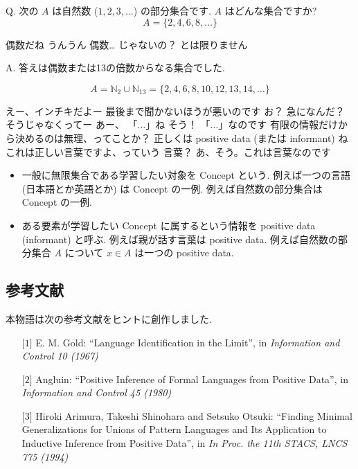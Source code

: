 \begin{boxnote}
Q. 次の $A$ は自然数 ($1, 2, 3, \ldots$) の部分集合です.  $A$ はどんな集合ですか?
$$A = \{2, 4, 6, 8, \ldots\}$$
\end{boxnote}

\YUKARI 偶数だね
\YUI うんうん
\YUKARI 偶数… じゃないの？
\YUZUKO とは限りません

\begin{boxnote}
    A. 答えは偶数または13の倍数からなる集合でした.

    $$A = \mathbb{N}_{2} \cup \mathbb{N}_{13} = \{2, 4, 6, 8, 10, 12, 13, 14, \ldots\}$$
\end{boxnote}

\YUKARI えー、インチキだよー
\YUZUKO 最後まで聞かないほうが悪いのです
\YUI お？ 急になんだ？
\YUZUKO そうじゃなくってー
\YUKARI あー、 「$\dots$」ね
\YUZUKO そう！ 「$\dots$」なのです
\YUI 有限の情報だけから決めるのは無理、ってことか？
\YUZUKO 正しくは positive data (または informant) ね
\YUZUKO これは正しい言葉ですよ、っていう
\YUKARI 言葉？
\YUZUKO あ、そう。これは言葉なのです

\begin{boxnote}
    \begin{itemize}
        \item
            一般に無限集合である学習したい対象を Concept という.
            例えば一つの言語 (日本語とか英語とか) は Concept の一例.
            例えば自然数の部分集合は Concept の一例.
        \item
            ある要素が学習したい Concept に属するという情報を positive data (informant) と呼ぶ.
            例えば親が話す言葉は positive data.
            例えば自然数の部分集合 $A$ について $x \in A$ は一つの positive data.
    \end{itemize}
\end{boxnote}

\subsection*{参考文献}

本物語は次の参考文献をヒントに創作しました.

\begin{enumerate}
    \item[$\lbrack 1 \rbrack$] E. M. Gold: ``Language Identification in the Limit'', in \emph{Information and Control 10 (1967)}
    \item[$\lbrack 2 \rbrack$] Angluin: ``Positive Inference of Formal Languages from Positive Data'', in \emph{Information and Control 45 (1980)}
    \item[$\lbrack 3 \rbrack$] {Hiroki Arimura, Takeshi Shinohara and Setsuko Otsuki}: ``{Finding Minimal Generalizations for Unions of Pattern Languages and Its Application to Inductive Inference from Positive Data}'', in \emph{In Proc. the 11th STACS, LNCS 775 (1994)}
\end{enumerate}

